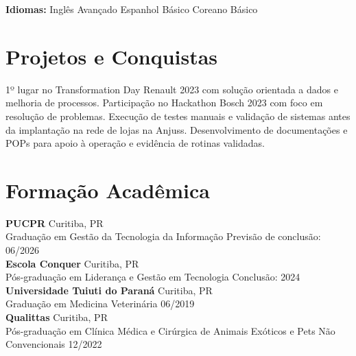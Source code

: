 \documentclass[11pt,a4paper]{article}
\begin{document}
\textbf{Idiomas:} Inglês Avançado \enspace\textbullet\enspace Espanhol Básico \enspace\textbullet\enspace Coreano Básico

\section{Projetos e Conquistas}

1º lugar no Transformation Day Renault 2023 com solução orientada a dados e melhoria de processos. Participação no Hackathon Bosch 2023 com foco em resolução de problemas. Execução de testes manuais e validação de sistemas antes da implantação na rede de lojas na Anjuss. Desenvolvimento de documentações e POPs para apoio à operação e evidência de rotinas validadas.

\section{Formação Acadêmica}

\textbf{PUCPR} \hfill Curitiba, PR\\
Graduação em Gestão da Tecnologia da Informação \hfill Previsão de conclusão: 06/2026\\[6pt]

\textbf{Escola Conquer} \hfill Curitiba, PR\\
Pós-graduação em Liderança e Gestão em Tecnologia \hfill Conclusão: 2024\\[6pt]

\textbf{Universidade Tuiuti do Paraná} \hfill Curitiba, PR\\
Graduação em Medicina Veterinária \hfill 06/2019\\[6pt]

\textbf{Qualittas} \hfill Curitiba, PR\\
Pós-graduação em Clínica Médica e Cirúrgica de Animais Exóticos e Pets Não Convencionais \hfill 12/2022
\end{document}
